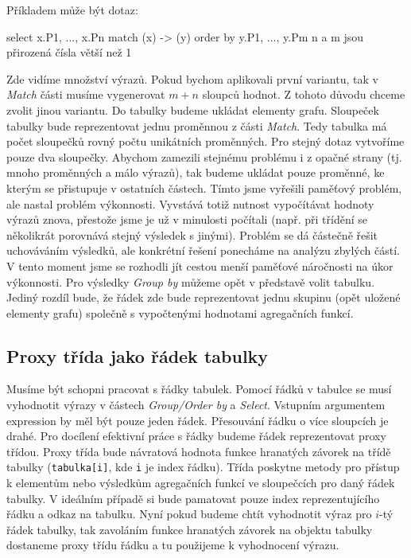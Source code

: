 \clearpage

Příkladem může být dotaz: 
\begin{code}
select x.P1, ..., x.Pn match (x) -> (y) order by y.P1, ..., y.Pm  
n a m jsou přirozená čísla větší než 1
\end{code}
Zde vidíme množství výrazů.
Pokud bychom aplikovali první variantu, tak v \textit{Match} části musíme vygenerovat $m + n$ sloupců hodnot.
Z tohoto důvodu chceme zvolit jinou variantu.
Do tabulky budeme ukládat elementy grafu.
Sloupeček tabulky bude reprezentovat jednu proměnnou z části \textit{Match}.
Tedy tabulka má počet sloupečků rovný počtu unikátních proměnných. 
Pro stejný dotaz vytvoříme pouze dva sloupečky.
Abychom zamezili stejnému problému i z opačné strany (tj. mnoho proměnných a málo výrazů), tak budeme ukládat pouze proměnné, ke kterým se přistupuje v ostatních částech.
Tímto jsme vyřešili paměťový problém, ale nastal problém výkonnosti.
Vyvstává totiž nutnost vypočítávat hodnoty výrazů znova, přestože jsme je už v minulosti počítali (např. při třídění se několikrát porovnává stejný výsledek s jinými).
Problém se dá částečně řešit uchováváním výsledků, ale konkrétní řešení ponecháme na analýzu zbylých částí.
V tento moment jsme se rozhodli jít cestou menší paměťové náročnosti na úkor výkonnosti.
Pro výsledky \textit{Group by} můžeme opět v představě volit tabulku.
Jediný rozdíl bude, že řádek zde bude reprezentovat jednu skupinu (opět uložené elementy grafu) společně s vypočtenými hodnotami agregačních funkcí.

\subsection{Proxy třída jako řádek tabulky}

Musíme být schopni pracovat s řádky tabulek.
Pomocí řádků v tabulce se musí vyhodnotit výrazy v částech \textit{Group/Order by} a \textit{Select}.
Vstupním argumentem expression by měl být pouze jeden řádek.
Přesouvání řádku o více sloupcích je drahé.
Pro docílení efektivní práce s řádky budeme řádek reprezentovat proxy třídou.
Proxy třída bude návratová hodnota funkce hranatých závorek na třídě tabulky (\texttt{tabulka[i]}, kde \texttt{i} je index řádku).
Třída poskytne metody pro přístup k elementům nebo výsledkům agregačních funkcí ve sloupečcích pro daný řádek tabulky.
V ideálním případě si bude pamatovat pouze index reprezentujícího řádku a odkaz na tabulku.
Nyní pokud budeme chtít vyhodnotit výraz pro $i$-tý řádek tabulky, tak zavoláním funkce hranatých závorek na objektu tabulky dostaneme proxy třídu řádku a tu použijeme k vyhodnocení výrazu.

